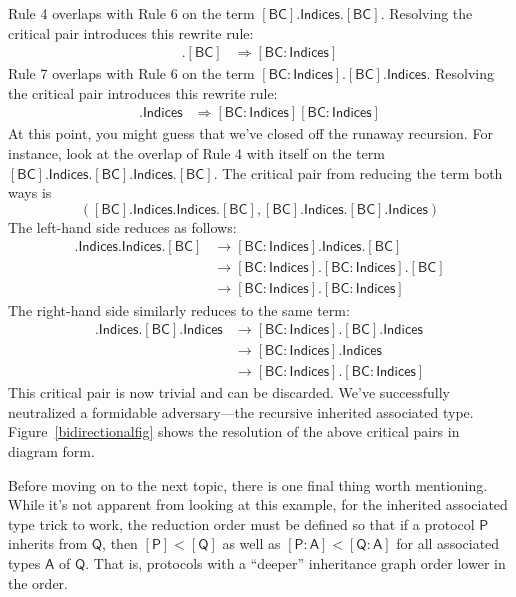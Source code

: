\documentclass[headsepline,bibliography=totoc]{scrreport}
\newcommand{\namesym}[1]{\mathsf{#1}}
\newcommand{\proto}[1]{\bm{\mathsf{#1}}}
\newcommand{\protosym}[1]{[\proto{#1}]}
\newcommand{\assocsym}[2]{[\proto{#1}\colon\namesym{#2}]}
\theoremstyle{definition}
\theoremstyle{definition}
\theoremstyle{definition}
\begin{document}
Rule 4 overlaps with Rule 6 on the term $\protosym{BC}.\namesym{Indices}.\protosym{BC}$. Resolving the critical pair introduces this rewrite rule:
\begin{align}
\assocsym{BC}{Indices}.\protosym{BC}&\Rightarrow\assocsym{BC}{Indices}\tag{7}
\end{align}
Rule 7 overlaps with Rule 6 on the term $\assocsym{BC}{Indices}.\protosym{BC}.\namesym{Indices}$. Resolving the critical pair introduces this rewrite rule:
\begin{align}
\assocsym{BC}{Indices}.\namesym{Indices}&\Rightarrow\assocsym{BC}{Indices}\assocsym{BC}{Indices}\tag{8}
\end{align}
At this point, you might guess that we've closed off the runaway recursion. For instance, look at the overlap of Rule 4 with itself on the term $\protosym{BC}.\namesym{Indices}.\protosym{BC}.\namesym{Indices}.\protosym{BC}$. The critical pair from reducing the term both ways is
\[(\protosym{BC}.\namesym{Indices}.\namesym{Indices}.\protosym{BC}, \protosym{BC}.\namesym{Indices}.\protosym{BC}.\namesym{Indices})\]
The left-hand side reduces as follows:
\begin{align*}
\protosym{BC}.\namesym{Indices}.\namesym{Indices}.\protosym{BC}&\rightarrow
\assocsym{BC}{Indices}.\namesym{Indices}.\protosym{BC}\tag{Rule 6}\\
&\rightarrow
\assocsym{BC}{Indices}.\assocsym{BC}{Indices}.\protosym{BC}\tag{Rule 8}\\
&\rightarrow
\assocsym{BC}{Indices}.\assocsym{BC}{Indices}\tag{Rule 7}
\end{align*}
The right-hand side similarly reduces to the same term:
\begin{align*}
\protosym{BC}.\namesym{Indices}.\protosym{BC}.\namesym{Indices}&\rightarrow
\assocsym{BC}{Indices}.\protosym{BC}.\namesym{Indices}\tag{Rule 6}\\
&\rightarrow
\assocsym{BC}{Indices}.\namesym{Indices}\tag{Rule 7}\\
&\rightarrow
\assocsym{BC}{Indices}.\assocsym{BC}{Indices}\tag{Rule 8}
\end{align*}
This critical pair is now trivial and can be discarded. We've successfully neutralized a formidable adversary---the recursive inherited associated type. Figure~\ref{bidirectionalfig} shows the resolution of the above critical pairs in diagram form.

Before moving on to the next topic, there is one final thing worth mentioning. While it's not apparent from looking at this example, for the inherited associated type trick to work, the reduction order must be defined so that if a protocol $\proto{P}$ inherits from $\proto{Q}$, then $\protosym{P}<\protosym{Q}$ as well as $\assocsym{P}{A}<\assocsym{Q}{A}$ for all associated types $\namesym{A}$ of $\proto{Q}$. That is, protocols with a ``deeper'' inheritance graph order lower in the order.
\end{document}
